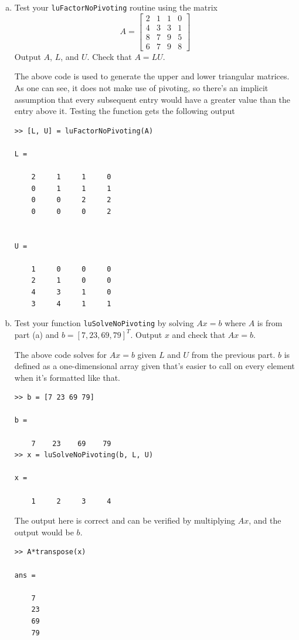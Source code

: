 \documentclass[10pt,letterpaper]{article}
\begin{document}
\begin{enumerate}[(a)]

\item Test your {\tt luFactorNoPivoting} routine using the matrix
$$A = \begin{bmatrix}
2 & 1 & 1 & 0 \\
4 & 3 & 3 & 1 \\
8 & 7 & 9 & 5 \\
6 & 7 & 9 & 8 
\end{bmatrix}$$
Output $A$, $L$, and $U$. Check that $A = LU$.

\color{TangGreen}

The above code is used to generate the upper and lower triangular matrices. As one can see, it does not make use of pivoting, so there's an implicit assumption that every subsequent entry would have a greater value than the entry above it. Testing the function gets the following output
\begin{lstlisting}
>> [L, U] = luFactorNoPivoting(A)

L =

	2     1     1     0
	0     1     1     1
	0     0     2     2
	0     0     0     2


U =

	1     0     0     0
	2     1     0     0
	4     3     1     0
	3     4     1     1
\end{lstlisting}
\color{black}

\item Test your function {\tt luSolveNoPivoting} by solving $Ax = b$ where $A$ is from part (a) and $b = [7, 23, 69, 79]^{T}$. Output $x$ and check that $Ax = b$. 

\color{TangGreen}

The above code solves for $Ax = b$ given $L$ and $U$ from the previous part. $b$ is defined as a one-dimensional array given that's easier to call on every element when it's formatted like that. 
\begin{lstlisting}
>> b = [7 23 69 79]

b =

	7    23    69    79
>> x = luSolveNoPivoting(b, L, U)

x =

	1     2     3     4
\end{lstlisting}
The output here is correct and can be verified by multiplying $Ax$, and the output would be $b$. 
\begin{lstlisting}
>> A*transpose(x)

ans =

	7
	23
	69
	79
\end{lstlisting}
\color{black}

\end{enumerate}
\end{document}
